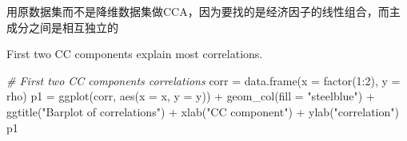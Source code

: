 \documentclass[
]{ctexart}
\newenvironment{Shaded}{\begin{snugshade}}{\end{snugshade}}
\newcommand{\AttributeTok}[1]{\textcolor[rgb]{0.77,0.63,0.00}{#1}}
\newcommand{\CommentTok}[1]{\textcolor[rgb]{0.56,0.35,0.01}{\textit{#1}}}
\newcommand{\DecValTok}[1]{\textcolor[rgb]{0.00,0.00,0.81}{#1}}
\newcommand{\FunctionTok}[1]{\textcolor[rgb]{0.00,0.00,0.00}{#1}}
\newcommand{\NormalTok}[1]{#1}
\newcommand{\OtherTok}[1]{\textcolor[rgb]{0.56,0.35,0.01}{#1}}
\newcommand{\SpecialCharTok}[1]{\textcolor[rgb]{0.00,0.00,0.00}{#1}}
\newcommand{\StringTok}[1]{\textcolor[rgb]{0.31,0.60,0.02}{#1}}
\begin{document}
用原数据集而不是降维数据集做CCA，因为要找的是经济因子的线性组合，而主成分之间是相互独立的

\begin{Shaded}
\end{Shaded}

First two CC components explain most correlations.

\begin{Shaded}
\begin{Highlighting}[]
\CommentTok{\# First two CC components correlations}
\NormalTok{corr }\OtherTok{=} \FunctionTok{data.frame}\NormalTok{(}\AttributeTok{x =} \FunctionTok{factor}\NormalTok{(}\DecValTok{1}\SpecialCharTok{:}\DecValTok{2}\NormalTok{), }\AttributeTok{y =}\NormalTok{ rho)}
\NormalTok{p1 }\OtherTok{=} \FunctionTok{ggplot}\NormalTok{(corr, }\FunctionTok{aes}\NormalTok{(}\AttributeTok{x =}\NormalTok{ x, }\AttributeTok{y =}\NormalTok{ y)) }\SpecialCharTok{+} \FunctionTok{geom\_col}\NormalTok{(}\AttributeTok{fill =} \StringTok{"steelblue"}\NormalTok{) }\SpecialCharTok{+} 
  \FunctionTok{ggtitle}\NormalTok{(}\StringTok{"Barplot of correlations"}\NormalTok{) }\SpecialCharTok{+}
  \FunctionTok{xlab}\NormalTok{(}\StringTok{"CC component"}\NormalTok{) }\SpecialCharTok{+} \FunctionTok{ylab}\NormalTok{(}\StringTok{"correlation"}\NormalTok{)}
\NormalTok{p1}
\end{Highlighting}
\end{Shaded}
\end{document}
